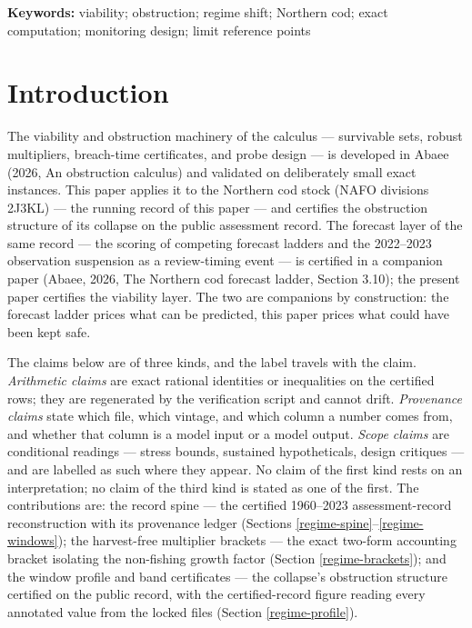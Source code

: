 \textbf{Keywords:} viability; obstruction; regime shift; Northern cod;
exact computation; monitoring design; limit reference points

\section{Introduction}\label{regime-intro}

The viability and obstruction machinery of the calculus --- survivable
sets, robust multipliers, breach-time certificates, and probe design ---
is developed in Abaee (2026, An obstruction calculus) and validated on deliberately small exact
instances. This paper applies it to the Northern cod stock (NAFO
divisions 2J3KL) --- the running record of this paper --- and certifies
the obstruction structure of its collapse on the public assessment
record. The forecast layer of the
same record --- the scoring of competing forecast ladders and the
2022--2023 observation suspension as a review-timing event --- is
certified in a companion paper (Abaee, 2026, The Northern cod forecast ladder, Section 3.10); the
present paper certifies the viability layer. The two are companions by
construction: the forecast ladder prices what can be predicted, this
paper prices what could have been kept safe.

The claims below are of three kinds, and the label travels with the
claim. \emph{Arithmetic claims} are exact rational identities or
inequalities on the certified rows; they are regenerated by the
verification script and cannot drift. \emph{Provenance claims} state
which file, which vintage, and which column a number comes from, and
whether that column is a model input or a model output. \emph{Scope
claims} are conditional readings --- stress bounds, sustained
hypotheticals, design critiques --- and are labelled as such where
they appear. No claim of the first kind rests on an interpretation; no
claim of the third kind is stated as one of the first. The
contributions are: the record spine --- the certified 1960--2023
assessment-record reconstruction with its provenance ledger (Sections
\ref{regime-spine}--\ref{regime-windows}); the harvest-free multiplier brackets ---
the exact two-form accounting bracket isolating the non-fishing growth
factor (Section \ref{regime-brackets}); and the window profile and band
certificates --- the collapse's obstruction structure certified on the
public record, with the certified-record figure reading every annotated
value from the locked files (Section \ref{regime-profile}).

